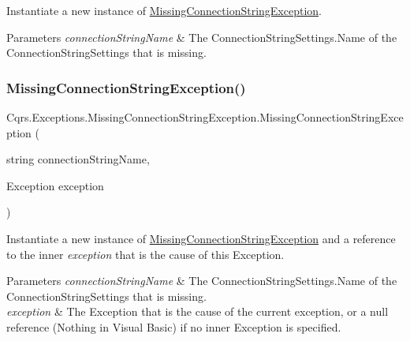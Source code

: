 Instantiate a new instance of \hyperlink{classCqrs_1_1Exceptions_1_1MissingConnectionStringException}{Missing\+Connection\+String\+Exception}. 


\begin{DoxyParams}{Parameters}
{\em connection\+String\+Name} & The Connection\+String\+Settings.\+Name of the Connection\+String\+Settings that is missing.\\
\hline
\end{DoxyParams}
\mbox{\label{classCqrs_1_1Exceptions_1_1MissingConnectionStringException_a0d80ef8486846848259953851974ebdc_a0d80ef8486846848259953851974ebdc}} 
\subsubsection{\texorpdfstring{Missing\+Connection\+String\+Exception()}{MissingConnectionStringException()}\hspace{0.1cm}{\footnotesize\ttfamily [2/2]}}
{\footnotesize\ttfamily Cqrs.\+Exceptions.\+Missing\+Connection\+String\+Exception.\+Missing\+Connection\+String\+Exception (\begin{DoxyParamCaption}\item[{string}]{connection\+String\+Name,  }\item[{Exception}]{exception }\end{DoxyParamCaption})}



Instantiate a new instance of \hyperlink{classCqrs_1_1Exceptions_1_1MissingConnectionStringException}{Missing\+Connection\+String\+Exception} and a reference to the inner {\itshape exception}  that is the cause of this Exception. 


\begin{DoxyParams}{Parameters}
{\em connection\+String\+Name} & The Connection\+String\+Settings.\+Name of the Connection\+String\+Settings that is missing.\\
\hline
{\em exception} & The Exception that is the cause of the current exception, or a null reference (Nothing in Visual Basic) if no inner Exception is specified.\\
\hline
\end{DoxyParams}


